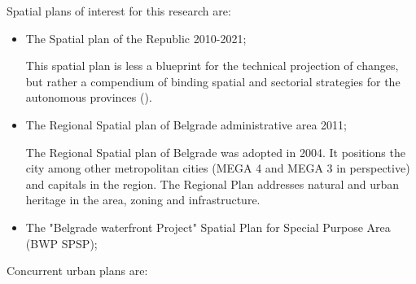 \documentclass[11pt]{report}
\begin{document}
Spatial plans of interest for this research are:

\begin{itemize}
\item The Spatial plan of the Republic 2010-2021;

This spatial plan is less a blueprint for the technical projection of changes, but rather a compendium of binding spatial and sectorial strategies for the autonomous provinces (\href{Stojkov}{\citealt{stojkov_prostorno_2012}}).

\item  The Regional Spatial plan of Belgrade administrative area 2011;

The Regional Spatial plan of Belgrade was adopted in 2004.
It positions the city among other metropolitan cities (MEGA 4 and MEGA 3 in perspective) and capitals in the region.
The Regional Plan addresses natural and urban heritage in the area, zoning and infrastructure. 

\item The "Belgrade waterfront Project" Spatial Plan for Special Purpose Area (BWP SPSP);
\end{itemize}

Concurrent urban plans are:
\end{document}
